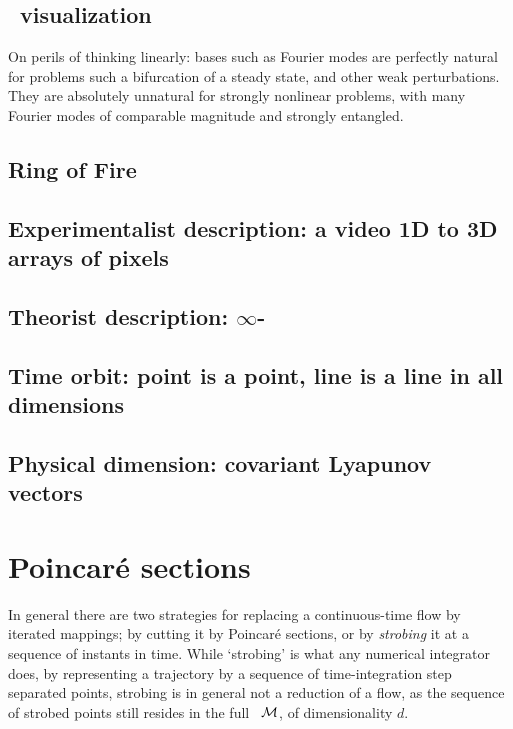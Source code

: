 \subsection{\Statesp\ visualization}

On perils of thinking linearly: bases such as Fourier modes are
perfectly natural for problems such a bifurcation of a steady state, and
other weak perturbations. They are absolutely unnatural for strongly
nonlinear problems, with many Fourier modes of comparable magnitude and
strongly entangled.

\subsection{\CLe}
\subsection{Ring of Fire}
\subsection{Experimentalist description: a video 1D to 3D arrays of pixels}
\subsection{Theorist description: $\infty$-\dmn\ \statesp}
\subsection{Time orbit: point is a point, line is a line in all dimensions}
\label{sect:TimeOrb}

\subsection{Physical dimension: covariant Lyapunov vectors}

\section{Poincar\'e sections}
\label{s:cut}

In general there are two strategies for replacing a continuous-time flow
by iterated mappings; by cutting it by Poincar\'e sections, or by
\emph{strobing} it at a sequence of instants in time. While
`strobing' is what any numerical integrator does, by representing a
trajectory by a sequence of time-integration step separated points,
strobing is in general not a reduction of a flow, as the sequence of
strobed points still resides in the full \statesp\ ${\cal M}$, of
dimensionality $d$.


